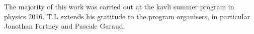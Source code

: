 \documentclass[a4paper,fleqn,usenatbib]{mnras}
\begin{document}
The majority of this work was carried out at the kavli summer program in physics 2016. T.L extends his gratitude to the program organisers, in particular Jonothan Fortney and Pascale Garaud.





%











\bsp	%
\label{lastpage}
\end{document}
